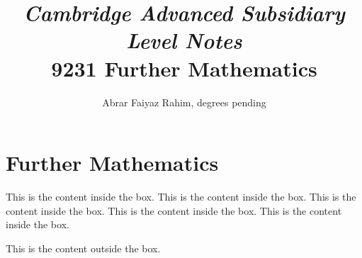 \documentclass[titlepage]{article}
\title{\emph{Cambridge Advanced Subsidiary Level Notes} \\ 
9231 Further Mathematics}
\author{Abrar Faiyaz Rahim, degrees pending}
\date{}
\begin{document}
\begin{titlepage}
	\maketitle{}
\end{titlepage}

\section{Further Mathematics}
\begin{itempoint}
	This is the content inside the box.
	This is the content inside the box.
	This is the content inside the box.
	This is the content inside the box.
	This is the content inside the box.
\end{itempoint}
This is the content outside the box.
\end{document}
